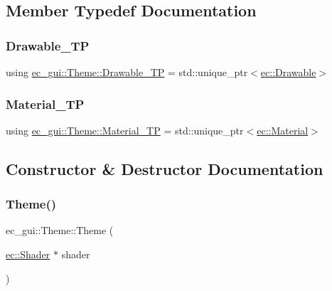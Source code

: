 \subsection{Member Typedef Documentation}
\mbox{\label{classec__gui_1_1_theme_a91d9c5c68bc50cc0f1470d141a6a231b}} 
\subsubsection{\texorpdfstring{Drawable\+\_\+\+TP}{Drawable\_TP}}
{\footnotesize\ttfamily using \mbox{\hyperlink{classec__gui_1_1_theme_a91d9c5c68bc50cc0f1470d141a6a231b}{ec\+\_\+gui\+::\+Theme\+::\+Drawable\+\_\+\+TP}} =  std\+::unique\+\_\+ptr$<$\mbox{\hyperlink{classec_1_1_drawable}{ec\+::\+Drawable}}$>$}

\mbox{\label{classec__gui_1_1_theme_ad0272419db6e28fc59f972460e5260ad}} 
\subsubsection{\texorpdfstring{Material\+\_\+\+TP}{Material\_TP}}
{\footnotesize\ttfamily using \mbox{\hyperlink{classec__gui_1_1_theme_ad0272419db6e28fc59f972460e5260ad}{ec\+\_\+gui\+::\+Theme\+::\+Material\+\_\+\+TP}} =  std\+::unique\+\_\+ptr$<$\mbox{\hyperlink{classec_1_1_material}{ec\+::\+Material}}$>$}



\subsection{Constructor \& Destructor Documentation}
\mbox{\label{classec__gui_1_1_theme_ad0a0cf74a37307bdb2cc12672f2649d4}} 
\subsubsection{\texorpdfstring{Theme()}{Theme()}}
{\footnotesize\ttfamily ec\+\_\+gui\+::\+Theme\+::\+Theme (\begin{DoxyParamCaption}\item[{\mbox{\hyperlink{classec_1_1_shader}{ec\+::\+Shader}} $\ast$}]{shader }\end{DoxyParamCaption})\hspace{0.3cm}{\ttfamily [explicit]}}

